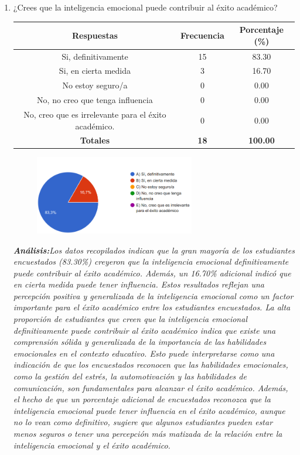 \documentclass[journal]{IEEEtran}
\begin{document}
\begin{enumerate}
\item¿Crees que la inteligencia emocional puede contribuir al éxito académico?
	\begin{table}[H]
		\renewcommand{\arraystretch}{1.3}
		\centering
		\begin{tabular}{|c|c|c|}
			\hline
			\textbf{Respuestas} & \textbf{Frecuencia} & \textbf{Porcentaje (\%)}\\
			\hline
			Si, definitivamente & 15 & 83.30 \\
			Si, en cierta medida & 3 & 16.70 \\
			No estoy seguro/a & 0 & 0.00\\
			No, no creo que tenga influencia & 0 & 0.00\\
			No, creo que es irrelevante para el éxito académico. & 0 & 0.00\\
			\hline
			\textbf{Totales} &\textbf{18}& \textbf{100.00}\\
			\hline
		\end{tabular}
	\end{table}
	\begin{figure}[h]
		\centering
		\includegraphics[width=07cm]{Pregunta 5}
	\end{figure}
	\textit{\textbf{Análisis:}Los datos recopilados indican que la gran mayoría de los estudiantes encuestados (83.30\%) creyeron que la inteligencia emocional definitivamente puede contribuir al éxito académico. Además, un 16.70\% adicional indicó que en cierta medida puede tener influencia. Estos resultados reflejan una percepción positiva y generalizada de la inteligencia emocional como un factor importante para el éxito académico entre los estudiantes encuestados.
La alta proporción de estudiantes que creen que la inteligencia emocional definitivamente puede contribuir al éxito académico indica que existe una comprensión sólida y generalizada de la importancia de las habilidades emocionales en el contexto educativo. Esto puede interpretarse como una indicación de que los encuestados reconocen que las habilidades emocionales, como la gestión del estrés, la automotivación y las habilidades de comunicación, son fundamentales para alcanzar el éxito académico.
Además, el hecho de que un porcentaje adicional de encuestados reconozca que la inteligencia emocional puede tener influencia en el éxito académico, aunque no lo vean como definitivo, sugiere que algunos estudiantes pueden estar menos seguros o tener una percepción más matizada de la relación entre la inteligencia emocional y el éxito académico.
}\\


\end{enumerate}
\end{document}
